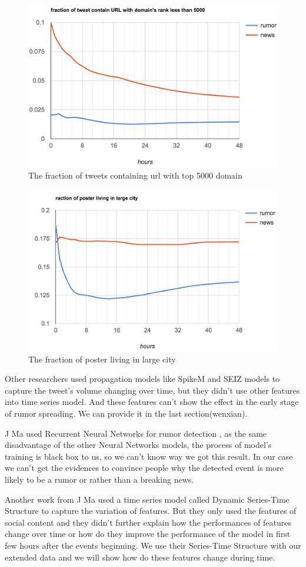 \begin{figure}[!h]
\centering
\includegraphics[width=0.52\columnwidth]{images/url5000.png}
\caption{The fraction of tweets containing url with top 5000 domain}
\label{fig:Url5000}
\end{figure}
\begin{figure}[!h]
\centering
\includegraphics[width=0.52\columnwidth]{images/largecity.png}
\caption{The fraction of poster living in large city}
\label{fig:largecity}
\end{figure}

\newpage
Other researchers used propagation models like SpikeM \cite{kwon2013prominent} and SEIZ models \cite{jin2013epidemiological} to capture the tweet's volume changing over time, but they didn't use other features into time series model. And these features can't show the effect in the early stage of rumor spreading. We can provide it in the last section(wenxian).

J Ma used Recurrent Neural Networks for rumor detection \cite{madetecting}, as the same disadvantage of the other Neural Networks models, the process of model's training is black box to us, so we can't know way we got this result. In our case we can't get the evidences to convince people why the detected event is more likely to be a rumor or rather than a breaking news. 

Another work from J Ma used a time series model called Dynamic Series-Time Structure \cite{ma2015detect} to capture the variation of features. But they only used the features of social content and they didn't further explain how the performances of features change over time or how do they improve the performance of the model in first few hours after the events beginning.  We use their Series-Time Structure with our extended data and we will show how do these features change during time.

